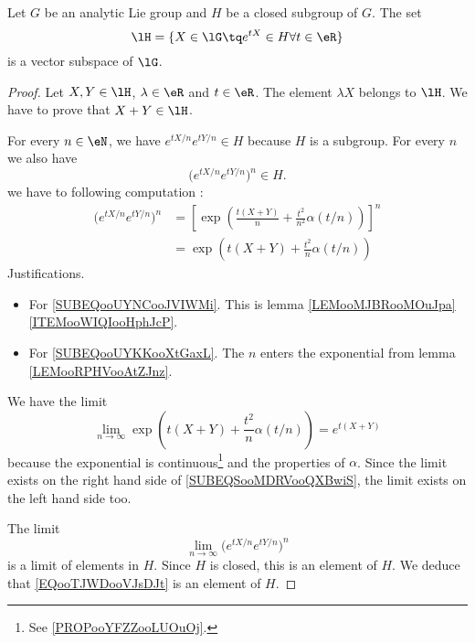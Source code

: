 \begin{lemma}     \label{LEMooFXKBooRnzZKQ}
	Let \( G\) be an analytic Lie group and \( H\) be a closed subgroup of \( G\). The set
	\begin{equation}
		\lH=\{ X\in \lG\tq  e^{tX}\in H\forall t\in \eR \}
	\end{equation}
	is a vector subspace of \( \lG\).
\end{lemma}

\begin{proof}
	Let \( X,Y\in \lH\), \( \lambda\in \eR\) and \( t\in \eR\). The element \( \lambda X\) belongs to \( \lH\). We have to prove that \( X+Y\in \lH\).

	For every \( n\in \eN\), we have \(  e^{tX/n} e^{tY/n}\in H\) because \( H\) is a subgroup. For every \( n\) we also have
	\begin{equation}
		\big(  e^{tX/n} e^{tY/n} \big)^n\in H.
	\end{equation}
	we have to following computation :
	\begin{subequations}        \label{SUBEQSooMDRVooQXBwiS}
		\begin{align}
			\big(  e^{tX/n} e^{tY/n} \big)^n & =\left[ \exp\left( \frac{ t(X+Y) }{ n }+\frac{ t^2 }{ n^2 }\alpha(t/n) \right)  \right]^n \label{SUBEQooUYNCooJVIWMi} \\
			                                 & =\exp\left( t(X+Y)+\frac{ t^2 }{n  }\alpha(t/n) \right)    \label{SUBEQooUYKKooXtGaxL}
		\end{align}
	\end{subequations}
	Justifications.
	\begin{itemize}
		\item For \eqref{SUBEQooUYNCooJVIWMi}. This is lemma \ref{LEMooMJBRooMOuJpa}\ref{ITEMooWIQIooHphJcP}.
		\item For \eqref{SUBEQooUYKKooXtGaxL}. The \( n\) enters the exponential from lemma \ref{LEMooRPHVooAtZJnz}.
	\end{itemize}
	We have the limit
	\begin{equation}        \label{EQooTJWDooVJsDJt}
		\lim_{n\to \infty} \exp\left( t(X+Y)+\frac{ t^2 }{n  }\alpha(t/n) \right) =  e^{t(X+Y)}
	\end{equation}
	because the exponential is continuous\footnote{See \ref{PROPooYFZZooLUOuOj}.} and the properties of \( \alpha\). Since the limit exists on the right hand side of \eqref{SUBEQSooMDRVooQXBwiS}, the limit exists on the left hand side too.

	The limit
	\begin{equation}
		\lim_{n\to \infty} \big(  e^{tX/n} e^{tY/n} \big)^n
	\end{equation}
	is a limit of elements in \( H\). Since \( H\) is closed, this is an element of \( H\). We deduce that \eqref{EQooTJWDooVJsDJt} is an element of \( H\).
\end{proof}

